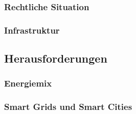 \subsubsection{Rechtliche Situation}

\subsubsection{Infrastruktur}

\subsection{Herausforderungen}

\subsubsection{Energiemix}

\subsubsection{Smart Grids und Smart Cities}

\newpage